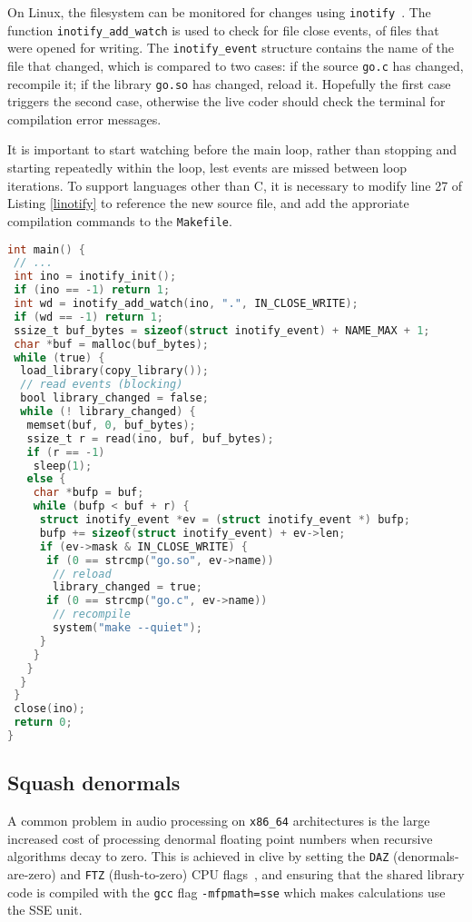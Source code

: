 \documentclass[11pt,a4paper]{article}
\begin{document}
On Linux, the filesystem can be monitored for changes using
\lstinline!inotify!~\cite{INOTIFY}. The function
\lstinline!inotify_add_watch! is used to check for file close events, of
files that were opened for writing. The \lstinline!inotify_event!
structure contains the name of the file that changed, which is compared
to two cases: if the source \lstinline!go.c! has changed, recompile it;
if the library \lstinline!go.so! has changed, reload it. Hopefully the
first case triggers the second case, otherwise the live coder should
check the terminal for compilation error messages.

It is important to start watching before the main loop, rather than
stopping and starting repeatedly within the loop, lest events are missed
between loop iterations. To support languages other than C, it is
necessary to modify line 27 of Listing \ref{linotify} to reference the
new source file, and add the approriate compilation commands to the
\lstinline!Makefile!.

\begin{lstlisting}[language=C, caption={Using inotify}, label=linotify]
int main() {
 // ...
 int ino = inotify_init();
 if (ino == -1) return 1;
 int wd = inotify_add_watch(ino, ".", IN_CLOSE_WRITE);
 if (wd == -1) return 1;
 ssize_t buf_bytes = sizeof(struct inotify_event) + NAME_MAX + 1;
 char *buf = malloc(buf_bytes);
 while (true) {
  load_library(copy_library());
  // read events (blocking)
  bool library_changed = false;
  while (! library_changed) {
   memset(buf, 0, buf_bytes);
   ssize_t r = read(ino, buf, buf_bytes);
   if (r == -1)
    sleep(1);
   else {
    char *bufp = buf;
    while (bufp < buf + r) {
     struct inotify_event *ev = (struct inotify_event *) bufp;
     bufp += sizeof(struct inotify_event) + ev->len;
     if (ev->mask & IN_CLOSE_WRITE) {
      if (0 == strcmp("go.so", ev->name))
       // reload
       library_changed = true;
      if (0 == strcmp("go.c", ev->name))
       // recompile
       system("make --quiet");
     }
    }
   }
  }
 }
 close(ino);
 return 0;
}
\end{lstlisting}

\subsection{Squash denormals}\label{squash-denormals}

A common problem in audio processing on \lstinline!x86_64! architectures
is the large increased cost of processing denormal floating point
numbers when recursive algorithms decay to zero. This is achieved in
clive by setting the \lstinline!DAZ! (denormals-are-zero) and
\lstinline!FTZ! (flush-to-zero) CPU flags~\cite{DAZFTZ}, and ensuring
that the shared library code is compiled with the \lstinline!gcc! flag
\lstinline!-mfpmath=sse! which makes calculations use the SSE unit.
\end{document}
